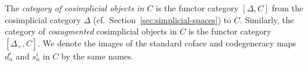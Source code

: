 \documentclass[a4paper,openany]{scrbook}
\DeclareMathOperator{\Open}{Open}
\newcommand{\nerve}{\mathcal N}
\begin{document}
%




\begin{defn}
The \emph{category of cosimplicial objects in $C$} is the functor category $[\Delta,C]$ from the cosimplicial category $\Delta$ (cf.~Section~\ref{sec:simplicial-spaces}) to $C$. Similarly, the category of \emph{coaugmented} cosimplicial objects in $C$ is the functor category $[\Delta_+,C]$. We denote the images of the standard coface and codegeneracy maps $d^i_n$ and $s^i_n$ in $C$ by the same names.
\end{defn}
\end{document}
